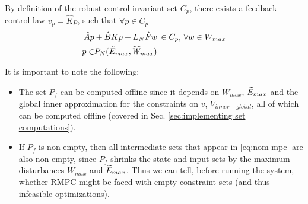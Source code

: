 By definition of the robust control invariant set $C_p$, there exists a feedback control law $v_p=\hat{K}p$, such that $\forall p\in C_p$
\begin{subequations}
\begin{align}
\label{eq:C_def}
\hat{A}p &+ \hat{B}Kp+L_N \hat{F}w \, \in C_p,\, \forall w \in W_{max} \\
p \in &P_N(\tilde{E}_{max}, \widehat{W}_{max})
\end{align}
\end{subequations}

It is important to note the following:
\begin{itemize}
	\item The set $P_f$ can be computed offline since it depends on $W_{max}$, $\widetilde{E}_{max}$ and the global inner approximation for the constraints on $v$, $V_{inner-global}$, all of which can be computed offline (covered in Sec. \ref{sec:implementing set computations}).
	\item If $P_f$ is non-empty, then all intermediate sets that appear in \eqref{eq:nom mpc} are also non-empty, since $P_f$ shrinks the state and input sets by the maximum disturbances $W_{max}$ and $\widetilde{E}_{max}$.	
	Thus we can tell, before running the system, whether RMPC might be faced with empty constraint sets (and thus infeasible optimizations).
\end{itemize}
%
%
